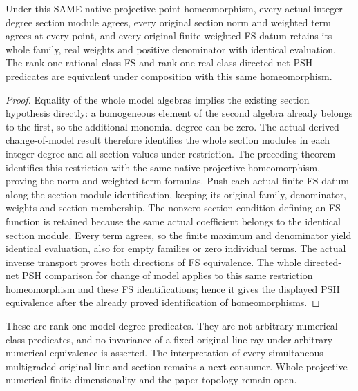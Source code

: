 \begin{theorem}\label{thm:rank-one-same-algebra-entire-section-fs-psh}
\leanok
{}
Under this SAME native-projective-point homeomorphism, every actual integer-degree section module agrees, every original section norm and weighted term agrees at every point, and every original finite weighted FS datum retains its whole family, real weights and positive denominator with identical evaluation. The rank-one rational-class FS and rank-one real-class directed-net PSH predicates are equivalent under composition with this same homeomorphism.
\end{theorem}
\begin{proof}
Equality of the whole model algebras implies the existing section hypothesis directly: a homogeneous element of the second algebra already belongs to the first, so the additional monomial degree can be zero. The actual derived change-of-model result therefore identifies the whole section modules in each integer degree and all section values under restriction. The preceding theorem identifies this restriction with the same native-projective homeomorphism, proving the norm and weighted-term formulas. Push each actual finite FS datum along the section-module identification, keeping its original family, denominator, weights and section membership. The nonzero-section condition defining an FS function is retained because the same actual coefficient belongs to the identical section module. Every term agrees, so the finite maximum and denominator yield identical evaluation, also for empty families or zero individual terms. The actual inverse transport proves both directions of FS equivalence. The whole directed-net PSH comparison for change of model applies to this same restriction homeomorphism and these FS identifications; hence it gives the displayed PSH equivalence after the already proved identification of homeomorphisms.
\end{proof}
These are rank-one model-degree predicates. They are not arbitrary numerical-class predicates, and no invariance of a fixed original line ray under arbitrary numerical equivalence is asserted. The interpretation of every simultaneous multigraded original line and section remains a next consumer. Whole projective numerical finite dimensionality and the paper topology remain open.
